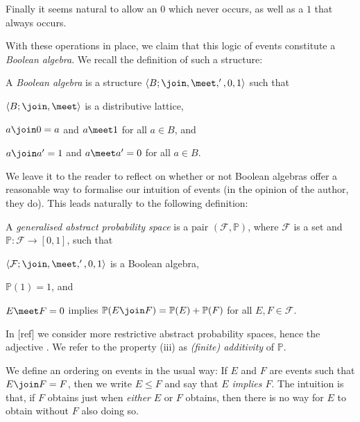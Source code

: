 \documentclass[article, a4paper, 11pt, oneside]{memoir}
\numberwithin{equation}{chapter}
\newcommand{\calF}{\mathcal{F}}
\renewcommand{\P}{\mathbb{P}}
\begin{document}
Finally it seems natural to allow an  $0$ which never occurs, as well as a  $1$ that always occurs.

With these operations in place, we claim that this logic of events constitute a \emph{Boolean algebra}. We recall the definition of such a structure:

\begin{definition}
    A \emph{Boolean algebra} is a structure $\langle B; \join, \meet, ', 0, 1 \rangle$ such that
    \begin{enumdef}
        \item $\langle B; \join, \meet \rangle$ is a distributive lattice,
        \item $a \join 0 = a$ and $a \meet 1$ for all $a \in B$, and
        \item $a \join a' = 1$ and $a \meet a' = 0$ for all $a \in B$.
    \end{enumdef}
\end{definition}
%
We leave it to the reader to reflect on whether or not Boolean algebras offer a reasonable way to formalise our intuition of events (in the opinion of the author, they do). This leads naturally to the following definition:

\begin{definition}
    A \emph{generalised abstract probability space} is a pair $(\calF, \P)$, where $\calF$ is a set and $\P \colon \calF \to [0,1]$, such that
    \begin{enumdef}
        \item $\langle \calF; \join, \meet, ', 0, 1 \rangle$ is a Boolean algebra,
        \item $\P(1) = 1$, and
        \item $E \meet F = 0$ implies $\P(E \join F) = \P(E) + \P(F)$ for all $E,F \in \calF$.
    \end{enumdef}
\end{definition}
%
In [ref] we consider more restrictive abstract probability spaces, hence the adjective . We refer to the property (iii) as \emph{(finite) additivity} of $\P$.

We define an ordering on events in the usual way: If $E$ and $F$ are events such that $E \join F = F$, then we write $E \leq F$ and say that \emph{$E$ implies $F$}. The intuition is that, if $F$ obtains just when \emph{either} $E$ or $F$ obtains, then there is no way for $E$ to obtain without $F$ also doing so.
\end{document}
